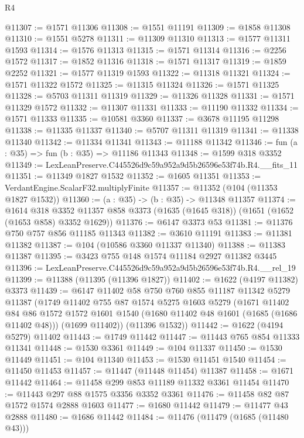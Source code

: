 \begin{lexlean}{R4}
\begin{coremodule}
@11307 := @1571 @11306
@11308 := @1551 @11191
@11309 := @1858 @11308
@11310 := @1551 @5278
@11311 := @11309 @11310
@11313 := @1577 @11311 @1593
@11314 := @1576 @11313
@11315 := @1571 @11314
@11316 := @2256 @1572
@11317 := @1852 @11316
@11318 := @1571 @11317
@11319 := @1859 @2252
@11321 := @1577 @11319 @1593
@11322 := @11318 @11321
@11324 := @1571 @11322 @1572
@11325 := @11315 @11324
@11326 := @1571 @11325
@11328 := @5703 @11311 @11319
@11329 := @11326 @11328
@11331 := @1571 @11329 @1572
@11332 := @11307 @11331
@11333 := @11190 @11332
@11334 := @1571 @11333
@11335 := @10581 @3360
@11337 := @3678 @11195 @11298
@11338 := @11335 @11337
@11340 := @5707 @11311 @11319
@11341 := @11338 @11340
@11342 := @11334 @11341
@11343 := @11188 @11342
@11346 := fun (a : @35) => fun (b : @35) => @11186 @11343
@11348 := @1599 @318 @3352
@11349 := LexLeanPreserve.C445526d9c59a952a9d5b26596e53f74b.R4.__fits_11
@11351 := @11349 @1827 @1532
@11352 := @1605 @11351
@11353 := VerdantEngine.ScalarF32.multiplyFinite
@11357 := @11352 (@104 (@11353 @1827 @1532))
@11360 := (a : @35) -> (b : @35) -> @11348 @11357
@11374 := @1614
    @318
    @3352
    @11357
    @858
    @3373
    (@1635 (@1645 @318))
    (@1651 (@1652 (@1653 @858) @3352 @1629))
@11376 := @6147 @3373 @53
@11381 := @11376 @750 @757 @856 @11185 @11343
@11382 := @3610 @11191
@11383 := @11381 @11382
@11387 := @104 (@10586 @3360 @11337 @11340)
@11388 := @11383 @11387
@11395 := @3423 @755 @148 @1574 @11184 @2927 @11382 @3445
@11396 := LexLeanPreserve.C445526d9c59a952a9d5b26596e53f74b.R4.__rel_19
@11399 := @11388 (@11395 (@11396 @1827))
@11402 := @1622 (@4197 @11382) @3373
@11439 := @6147
    @11402
    @58
    @750
    @760
    @855
    @11187
    @11342
    @5279
    @11387
    (@1749
      @11402
      @755
      @87
      @1574
      @5275
      @1603
      @5279
      (@1671
        @11402
        @84
        @86
        @1572
        @1572
        @1601
        @1540
        (@1680 @11402 @48 @1601 (@1685 (@1686 @11402 @48)))
        (@1699 @11402))
      (@11396 @1532))
@11442 := @1622 (@4194 @5279) @11402
@11443 := @1749 @11442
@11447 := @11443 @765 @854 @11333 @11341
@11448 := @1530 @3361
@11449 := @104 @11337
@11450 := @1530 @11449
@11451 := @104 @11340
@11453 := @1530 @11451 @1540
@11454 := @11450 @11453
@11457 := @11447 (@11448 @11454) @11387
@11458 := @1671 @11442
@11464 := @11458 @299 @853 @11189 @11332 @3361 @11454
@11470 := @11443 @297 @88 @1575 @3356 @3352 @3361
@11476 := @11458 @82 @87 @1572 @1574 @2888 @1603
@11477 := @1680 @11442
@11479 := @11477 @43 @2888
@11480 := @1686 @11442
@11484 := @11476 (@11479 (@1685 (@11480 @43)))

\end{coremodule}
\end{lexlean}
